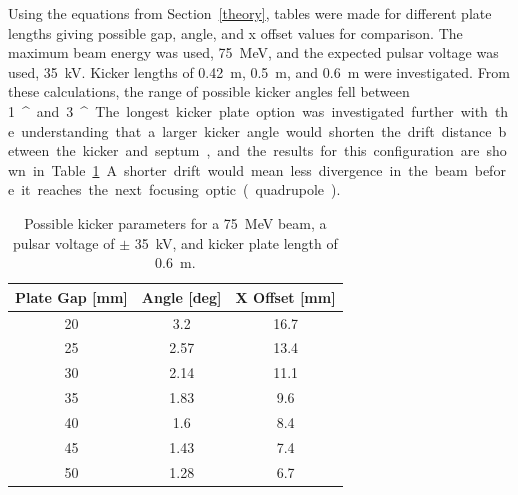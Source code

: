 \documentclass[aps,prab,preprint,groupedaddress,linenumbers]{revtex4-2}
\begin{document}
Using the equations from Section~\ref{theory}, 
tables were made for different plate lengths giving possible gap, angle, and x offset values for comparison. 
The maximum beam energy was used, \SI{75}{MeV}, and the expected pulsar voltage was used, \SI{35}{kV}.
Kicker lengths of \SI{0.42}{m}, \SI{0.5}{m}, and \SI{0.6}{m} were investigated.
From these calculations, the range of possible kicker angles fell between \SI{1}{^\circ} and \SI{3}{^\circ}.
The longest kicker plate option was investigated further with the understanding that 
a larger kicker angle would shorten the drift distance between the kicker and septum, 
and the results for this configuration are shown in Table~\ref{tab:kickparam}.
A shorter drift would mean less divergence in the beam before it reaches the next focusing optic (quadrupole).
\begin{table}%
	\begin{center}
		\caption{Possible kicker parameters for a \SI{75}{MeV} beam,  
			a pulsar voltage of $\pm$ \SI{35}{kV}, 
			and kicker plate length of \SI{0.6}{m}.}\label{tab:kickparam}
		\begin{tabular}{ccc}
			\toprule
			\toprule
			\textbf{Plate Gap [mm]} & \textbf{Angle [deg]}  & \textbf{X Offset [mm]} \\ 
			\midrule
			20 & 3.2   & 16.7    \\ %
			25 & 2.57  & 13.4  \\ %
			30 & 2.14  & 11.1 \\		 
			35 & 1.83  & 9.6	  \\
			40 & 1.6   & 8.4		 \\
			45 & 1.43  & 7.4      \\
			50 & 1.28  & 6.7   \\ 
			\bottomrule
		\end{tabular}	
	\end{center}
\end{table}
\end{document}
